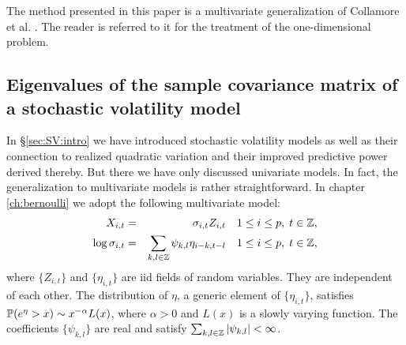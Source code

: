 The method presented in this paper is a multivariate generalization of
Collamore et al. \cite{collamore2014}. The reader is referred to it
for the treatment of the one-dimensional problem.


\subsection{Eigenvalues of the sample covariance matrix of a   
  stochastic volatility model}
In \S\ref{sec:SV:intro} we have introduced stochastic volatility
models as well as their connection to realized quadratic
variation and their improved predictive power derived thereby. But
there we have only discussed univariate models. In fact, the
generalization to multivariate models is rather straightforward. In
chapter \ref{ch:bernoulli} we adopt the following multivariate model:
\begin{eqnarray*}
  X_{i,t} &=& \sigma_{i,t} Z_{i,t} \quad
  1 \leq i \leq p,\;
  t \in \integers, \\
  \log \sigma_{i, t}
  &=&
  \sum_{k,l \in \integers} \psi_{k,l} \eta_{i-k, t-l}\quad
  1 \leq i \leq p,\;
  t \in \integers,
\end{eqnarray*}
where $\{Z_{i,t}\}$ and $\{\eta_{i,t}\}$ are iid fields of random
variables. They are independent of each other. The distribution of
$\eta$, a generic element of $\{\eta_{i,t}\}$, satisfies
$\P(e^\eta > x) \sim x^{-\alpha} L(x)$,
where $\alpha > 0$ and $L(x)$ is a slowly varying function. The
coefficients $\{\psi_{k,l}\}$ are real and satisfy
$\sum_{k, l \in \integers} |\psi_{k,l}| < \infty$.

